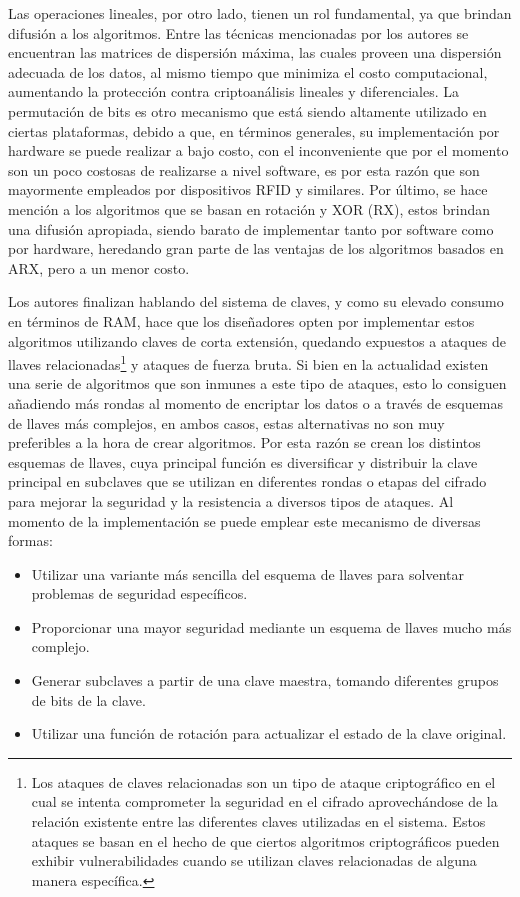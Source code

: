\documentclass[a4paper,10pt]{article}
\begin{document}
	Las operaciones lineales, por otro lado, tienen un rol fundamental, ya que brindan difusión a los algoritmos. Entre las técnicas mencionadas por los autores se encuentran las matrices de dispersión máxima, las cuales proveen una dispersión adecuada de los datos, al mismo tiempo que minimiza el costo computacional, aumentando la protección contra criptoanálisis lineales y diferenciales. La permutación de bits es otro mecanismo que está siendo altamente utilizado en ciertas plataformas, debido a que, en términos generales, su implementación por hardware se puede realizar a bajo costo, con el inconveniente que por el momento son un poco costosas de realizarse a nivel software, es por esta razón que son mayormente empleados por dispositivos RFID y similares. Por último, se hace mención a los algoritmos que se basan en rotación y XOR (RX), estos brindan una difusión apropiada, siendo barato de implementar tanto por software como por hardware, heredando gran parte de las ventajas de los algoritmos basados en ARX, pero a un menor costo.
	
	Los autores finalizan hablando del sistema de claves, y como su elevado consumo en términos de RAM, hace que los diseñadores opten por implementar estos algoritmos utilizando claves de corta extensión, quedando expuestos a ataques de llaves relacionadas\footnote{Los ataques de claves relacionadas son un tipo de ataque criptográfico en el cual se intenta comprometer la seguridad en el cifrado aprovechándose de la relación existente entre las diferentes claves utilizadas en el sistema. Estos ataques se basan en el hecho de que ciertos algoritmos criptográficos pueden exhibir vulnerabilidades cuando se utilizan claves relacionadas de alguna manera específica.} y ataques de fuerza bruta. Si bien en la actualidad existen una serie de algoritmos que son inmunes a este tipo de ataques, esto lo consiguen añadiendo más rondas al momento de encriptar los datos o a través de esquemas de llaves más complejos, en ambos casos, estas alternativas no son muy preferibles a la hora de crear algoritmos. Por esta razón se crean los distintos esquemas de llaves, cuya principal función es diversificar y distribuir la clave principal en subclaves que se utilizan en diferentes rondas o etapas del cifrado para mejorar la seguridad y la resistencia a diversos tipos de ataques. Al momento de la implementación se puede emplear este mecanismo de diversas formas:
	\begin{itemize}
		\item Utilizar una variante más sencilla del esquema de llaves para solventar problemas de seguridad específicos.
		\item Proporcionar una mayor seguridad mediante un esquema de llaves mucho más complejo.
		\item Generar subclaves a partir de una clave maestra, tomando diferentes grupos de bits de la clave.
		\item Utilizar una función de rotación para actualizar el estado de la clave original.
	\end{itemize}
	
\end{document}
